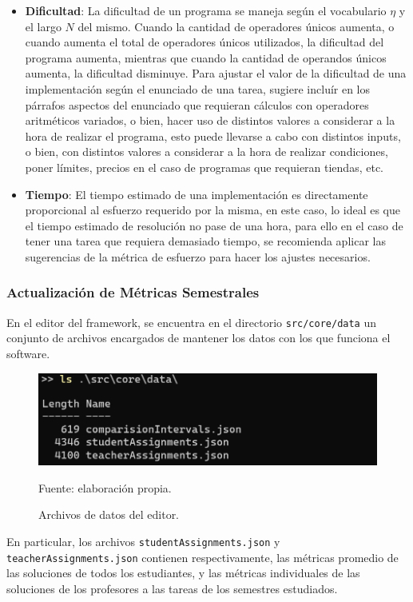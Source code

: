 \documentclass[letterpaper,12pt]{article}
\begin{document}
\begin{itemize}
  \item \textbf{Dificultad}: La dificultad de un programa se maneja según el vocabulario $\eta$ y el largo $N$ del mismo. Cuando la cantidad de operadores únicos aumenta, o cuando aumenta el total de operadores únicos utilizados, la dificultad del programa aumenta, mientras que cuando la cantidad de operandos únicos aumenta, la dificultad disminuye. Para ajustar el valor de la dificultad de una implementación según el enunciado de una tarea, sugiere incluír en los párrafos aspectos del enunciado que requieran cálculos con operadores aritméticos variados, o bien, hacer uso de distintos valores a considerar a la hora de realizar el programa, esto puede llevarse a cabo con distintos inputs, o bien, con distintos valores a considerar a la hora de realizar condiciones, poner límites, precios en el caso de programas que requieran tiendas, etc.
  \item \textbf{Tiempo}: El tiempo estimado de una implementación es directamente proporcional al esfuerzo requerido por la misma, en este caso, lo ideal es que el tiempo estimado de resolución no pase de una hora, para ello en el caso de tener una tarea que requiera demasiado tiempo, se recomienda aplicar las sugerencias de la métrica de esfuerzo para hacer los ajustes necesarios.
\end{itemize}

\subsubsection{Actualización de Métricas Semestrales} \label{sssec:metricsUpdate}

En el editor del framework, se encuentra en el directorio \texttt{src/core/data} un conjunto de archivos encargados de mantener los datos con los que funciona el software.
\begin{figure}[H]
  \centering
  \includegraphics[width=1\textwidth]{figures/datafiles.png}
  \caption{Archivos de datos del editor.} Fuente: elaboración propia.
  \label{datafiles}
\end{figure}
En particular, los archivos \texttt{studentAssignments.json} y \texttt{teacherAssignments.json} contienen respectivamente, las métricas promedio de las soluciones de todos los estudiantes, y las métricas individuales de las soluciones de los profesores a las tareas de los semestres estudiados.
\end{document}
